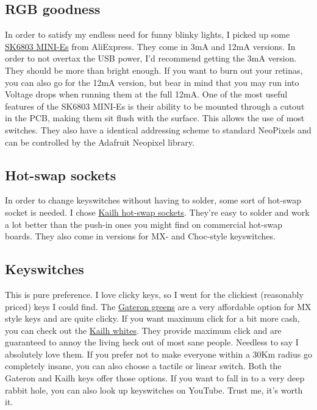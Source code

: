 \documentclass[english, 12pt]{scrartcl}
\begin{document}
	\subsection{RGB goodness}
	In order to satisfy my endless need for funny blinky lights, I picked up some \href{https://de.aliexpress.com/item/1005003636607308.html?spm=a2g0o.order_list.order_list_main.23.22bf5c5fJNwVec&gatewayAdapt=glo2deu}{SK6803 MINI-Es} from AliExpress. They come in 3mA and 12mA versions. In order to not overtax the USB power, I'd recommend getting the 3mA version. They should be more than bright enough. If you want to burn out your retinas, you can also go for the 12mA version, but bear in mind that you may run into Voltage drops when running them at the full 12mA.\newline
	One of the most useful features of the SK6803 MINI-Es is their ability to be mounted through a cutout in the PCB, making them sit flush with the surface. This allows the use of most switches. They also have a identical addressing scheme to standard NeoPixels and can be controlled by the Adafruit Neopixel library.
	
	\subsection{Hot-swap sockets}
	In order to change keyswitches without having to solder, some sort of hot-swap socket is needed. I chose \href{https://keycapsss.com/keyboard-parts/parts/49/kailh-hotswap-pcb-sockets-10-pcs?c=11}{Kailh hot-swap sockets}. They're easy to solder and work a lot better than the push-in ones you might find on commercial hot-swap boards. They also come in versions for MX- and Choc-style keyswitches.
	
	\subsection{Keyswitches}
	This is pure preference. I love clicky keys, so I went for the clickiest (reasonably priced) keys I could find. The \href{https://de.aliexpress.com/item/32980039972.html}{Gateron greens} are a very affordable option for MX style keys and are quite clicky. If you want maximum click for a bit more cash, you can check out the \href{https://keycapsss.com/switchestester/switches/65/kailh-low-profile-choc-switches?c=9}{Kailh whites}. They provide maximum click and are guaranteed to annoy the living heck out of most sane people. Needless to say I absolutely love them.\newline
	If you prefer not to make everyone within a 30Km radius go completely insane, you can also choose a tactile or linear switch. Both the Gateron and Kailh keys offer those options. If you want to fall in to a very deep rabbit hole, you can also look up keyswitches on YouTube. Trust me, it's worth it.
	
\end{document}
